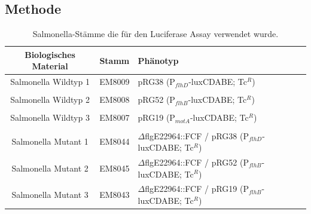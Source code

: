 \documentclass[oneside,10pt,a4paper]{report}
\begin{document}
			\subsection{Methode}
				\begin{table}[H]
				\centering
				\caption{Salmonella-Stämme die für den Luciferase Assay verwendet wurde.}
				\label{tab: exp6-biologisches Material part2}
				\begin{tabular}{ccp{7.5cm}}
					\toprule
					Biologisches Material& Stamm & Phänotyp\\
					\midrule
					\multirow{2}{*}{\parbox[t]{2cm}{Salmonella Wildtyp 1 }}  & \multirow{2}{*}{EM8009} & \multirow{2}{*}{\parbox[t]{7.5cm}{pRG38 (P$_{flhD}$-luxCDABE; Tc$^R$)}}\\
					&&\\
					&&\\
					\multirow{2}{*}{\parbox[t]{2cm}{Salmonella Wildtyp 2}}  & \multirow{2}{*}{EM8008} & \multirow{2}{*}{\parbox[t]{7.5cm}{pRG52 (P$_{flhB}$-luxCDABE; Tc$^R$)}}\\
					&&\\
					&&\\
					\multirow{2}{*}{\parbox[t]{2cm}{Salmonella Wildtyp 3}}  & \multirow{2}{*}{EM8007} & \multirow{2}{*}{\parbox[t]{7.5cm}{pRG19 (P$_{motA}$-luxCDABE; Tc$^R$)}}\\
					&&\\
					&&\\
					\multirow{3}{*}{\parbox[t]{2cm}{Salmonella Mutant 1}} & \multirow{3}{*}{EM8044} &\multirow{3}{*}{\parbox[t]{7.5cm}{$\Delta$flgE22964::FCF / pRG38 (P$_{flhD}$-luxCDABE; Tc$^R$)}} \\
					&&\\
					&&\\
					\multirow{3}{*}{\parbox[t]{2cm}{Salmonella Mutant 2}} & \multirow{3}{*}{EM8045} &\multirow{3}{*}{\parbox[t]{7.5cm}{$\Delta$flgE22964::FCF / pRG52 (P$_{flhB}$-luxCDABE; Tc$^R$)}} \\
					&&\\
					&&\\
					\multirow{3}{*}{\parbox[t]{2cm}{Salmonella Mutant 3}} & \multirow{3}{*}{EM8043} &\multirow{3}{*}{\parbox[t]{7.5cm}{$\Delta$flgE22964::FCF / pRG19 (P$_{flhB}$-luxCDABE; Tc$^R$)}} \\
					&&\\
					&&\\
					
					\bottomrule			
				\end{tabular}
			\end{table}
	
\end{document}
